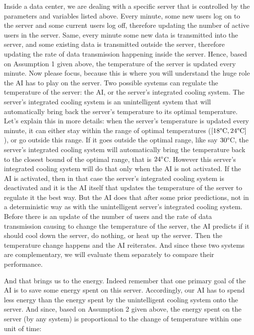 \documentclass[]{book}
\begin{document}
Inside a data center, we are dealing with a specific server that is controlled by the parameters and variables listed above. Every minute, some new users log on to the server and some current users log off, therefore updating the number of active users in the server. Same, every minute some new data is transmitted into the server, and some existing data is transmitted outside the server, therefore updating the rate of data transmission happening inside the server. Hence, based on Assumption 1 given above, the temperature of the server is updated every minute. Now please focus, because this is where you will understand the huge role the AI has to play on the server. Two possible systems can regulate the temperature of the server: the AI, or the server's integrated cooling system. The server's integrated cooling system is an unintelligent system that will automatically bring back the server's temperature to its optimal temperature. Let's explain this in more details: when the server's temperature is updated every minute, it can either stay within the range of optimal temperatures (\([18 \degree \textrm{C}, 24 \degree \textrm{C}]\)), or go outside this range. If it goes outside the optimal range, like say \(30 \degree\)C, the server's integrated cooling system will automatically bring the temperature back to the closest bound of the optimal range, that is \(24 \degree\)C. However this server's integrated cooling system will do that only when the AI is not activated. If the AI is activated, then in that case the server's integrated cooling system is deactivated and it is the AI itself that updates the temperature of the server to regulate it the best way. But the AI does that after some prior predictions, not in a deterministic way as with the unintelligent server's integrated cooling system. Before there is an update of the number of users and the rate of data transmission causing to change the temperature of the server, the AI predicts if it should cool down the server, do nothing, or heat up the server. Then the temperature change happens and the AI reiterates. And since these two systems are complementary, we will evaluate them separately to compare their performance.

And that brings us to the energy. Indeed remember that one primary goal of the AI is to save some energy spent on this server. Accordingly, our AI has to spend less energy than the energy spent by the unintelligent cooling system onto the server. And since, based on Assumption 2 given above, the energy spent on the server (by any system) is proportional to the change of temperature within one unit of time:
\end{document}
